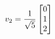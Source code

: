 \documentclass[preview]{standalone}
\begin{document}
\begin{align*}
\special{dvisvgm:raw <g id='unique000'>}v_{2} = \frac{1}{\sqrt{5}} \begin{bmatrix} 0 \\ 1 \\ 2 \end{bmatrix}\special{dvisvgm:raw </g>}
\end{align*}
\end{document}
